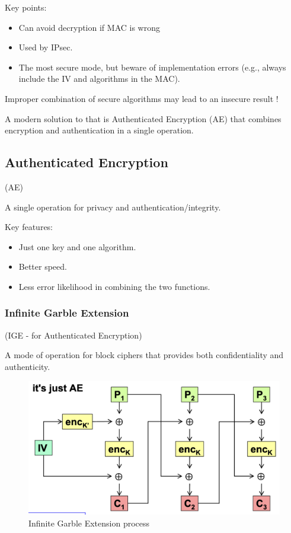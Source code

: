 Key points:
\begin{itemize}
    \item Can avoid decryption if MAC is wrong
    \item Used by IPsec.
    \item The most secure mode, but beware of implementation errors (e.g., always include the  IV  and algorithms in the MAC).
\end{itemize}

\begin{tcolorbox}[colback=red!10!white, colframe=red!70!black, coltitle=white, title=Beware]
    Improper combination of secure algorithms may lead to an insecure result !
\end{tcolorbox}
A modern solution to that is Authenticated Encryption (AE) that combines encryption and authentication in a single operation.

\subsection{Authenticated Encryption}
\begin{center}
    (AE)
\end{center}
A single operation for privacy and authentication/integrity.

Key features:
\begin{itemize}
    \item Just one key and one algorithm.
    \item Better speed.
    \item Less error likelihood in combining the two functions.
\end{itemize}

\subsubsection{Infinite Garble Extension}
\begin{center}
    (IGE - for Authenticated Encryption)
\end{center}
A mode of operation for block ciphers that provides both confidentiality and authenticity.

\begin{figure}[H]
    \centering
    \includegraphics[width=0.5\linewidth]{Images/Cryptography/AE.png}
    \caption{Infinite Garble Extension process}
\end{figure}

